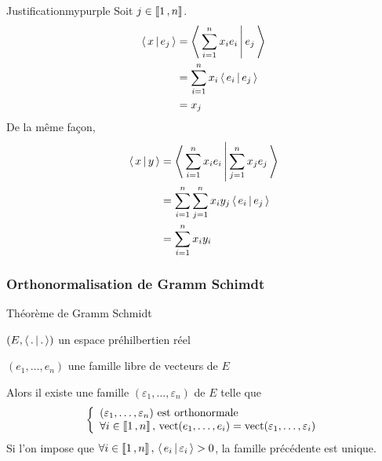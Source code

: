         \begin{demo}{Justification}{mypurple}
            Soit $j \in \left\llbracket 1 \, , n \right\rrbracket$. 
            \begin{align*}
                \left<\,x\,\middle|\,e_j\,\right> &= \left<\,\sum_{i=1}^{n} x_i e_i\,\middle|\,e_j\,\right> \\
                &= \sum_{i=1}^{n} x_i \left<\,e_i\,\middle|\,e_j\,\right> \\
                &= x_j 
            \end{align*}
            De la même façon, 
            \begin{align*}
                \left<\,x\,\middle|\,y\,\right> 
                &= \left<\,\sum_{i=1}^{n} x_i e_i\,\middle|\,\sum_{j=1}^{n} x_j e_j\,\right> \\
                &= \sum_{i=1}^{n} \sum_{j = 1}^{n} x_i y_j \left<\,e_i\,\middle|\,e_j\,\right> \\
                &= \sum_{i=1}^{n} x_i y_i
            \end{align*}
        \end{demo}

        \subsubsection{Orthonormalisation de Gramm Schimdt}

        \begin{theo}{Théorème de Gramm Schmidt}{}
            \begin{soient}
                \item $(E,\left<\,.\,\middle|\,.\,\right>)$ un espace préhilbertien réel
                \item $(e_1,\ldots,e_n)$ une famille libre de vecteurs de $E$
            \end{soient}
            Alors il existe une famille $(\varepsilon_1,\ldots,\varepsilon_n)$ de $E$ telle que \[ \et{(\varepsilon_1,\ldots,\varepsilon_n) \text{ est orthonormale}}{\forall i \in \intervalleEntier{1}{n}, \, \vect(e_1,\ldots,e_i) = \vect(\varepsilon_1,\ldots,\varepsilon_i)} \] 
            Si l’on impose que $\forall i \in \left\llbracket 1 \, , n \right\rrbracket, \, \left<\,e_i\,\middle|\,\varepsilon_i\,\right> > 0$, la famille précédente est unique.
        \end{theo}

